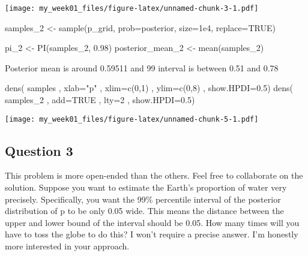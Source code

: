 \documentclass[
]{article}
\newenvironment{Shaded}{\begin{snugshade}}{\end{snugshade}}
\newcommand{\AttributeTok}[1]{\textcolor[rgb]{0.77,0.63,0.00}{#1}}
\newcommand{\ConstantTok}[1]{\textcolor[rgb]{0.00,0.00,0.00}{#1}}
\newcommand{\DecValTok}[1]{\textcolor[rgb]{0.00,0.00,0.81}{#1}}
\newcommand{\FloatTok}[1]{\textcolor[rgb]{0.00,0.00,0.81}{#1}}
\newcommand{\FunctionTok}[1]{\textcolor[rgb]{0.00,0.00,0.00}{#1}}
\newcommand{\NormalTok}[1]{#1}
\newcommand{\OtherTok}[1]{\textcolor[rgb]{0.56,0.35,0.01}{#1}}
\newcommand{\StringTok}[1]{\textcolor[rgb]{0.31,0.60,0.02}{#1}}
\begin{document}
\texttt{[image: my\_week01\_files/figure-latex/unnamed-chunk-3-1.pdf]}

\begin{Shaded}
\begin{Highlighting}[]
\NormalTok{samples\_2 }\OtherTok{\textless{}{-}} \FunctionTok{sample}\NormalTok{(p\_grid, }\AttributeTok{prob=}\NormalTok{posterior, }\AttributeTok{size=}\FloatTok{1e4}\NormalTok{, }\AttributeTok{replace=}\ConstantTok{TRUE}\NormalTok{) }

\NormalTok{pi\_2 }\OtherTok{\textless{}{-}} \FunctionTok{PI}\NormalTok{(samples\_2, }\FloatTok{0.98}\NormalTok{)}
\NormalTok{posterior\_mean\_2 }\OtherTok{\textless{}{-}} \FunctionTok{mean}\NormalTok{(samples\_2)}
\end{Highlighting}
\end{Shaded}

Posterior mean is around 0.59511 and 99 interval is between 0.51 and
0.78

\begin{Shaded}
\begin{Highlighting}[]
\FunctionTok{dens}\NormalTok{( samples , }\AttributeTok{xlab=}\StringTok{"p"}\NormalTok{ , }\AttributeTok{xlim=}\FunctionTok{c}\NormalTok{(}\DecValTok{0}\NormalTok{,}\DecValTok{1}\NormalTok{) , }\AttributeTok{ylim=}\FunctionTok{c}\NormalTok{(}\DecValTok{0}\NormalTok{,}\DecValTok{8}\NormalTok{) , }\AttributeTok{show.HPDI=}\FloatTok{0.5}\NormalTok{)}
\FunctionTok{dens}\NormalTok{( samples\_2 , }\AttributeTok{add=}\ConstantTok{TRUE}\NormalTok{ , }\AttributeTok{lty=}\DecValTok{2}\NormalTok{ , }\AttributeTok{show.HPDI=}\FloatTok{0.5}\NormalTok{)}
\end{Highlighting}
\end{Shaded}

\texttt{[image: my\_week01\_files/figure-latex/unnamed-chunk-5-1.pdf]}

\hypertarget{question-3}{%
\subsection{Question 3}\label{question-3}}

This problem is more open-ended than the others. Feel free to
collaborate on the solution. Suppose you want to estimate the Earth's
proportion of water very precisely. Specifically, you want the 99\%
percentile interval of the posterior distribution of p to be only 0.05
wide. This means the distance between the upper and lower bound of the
interval should be 0.05. How many times will you have to toss the globe
to do this? I won't require a precise answer. I'm honestly more
interested in your approach.
\end{document}
